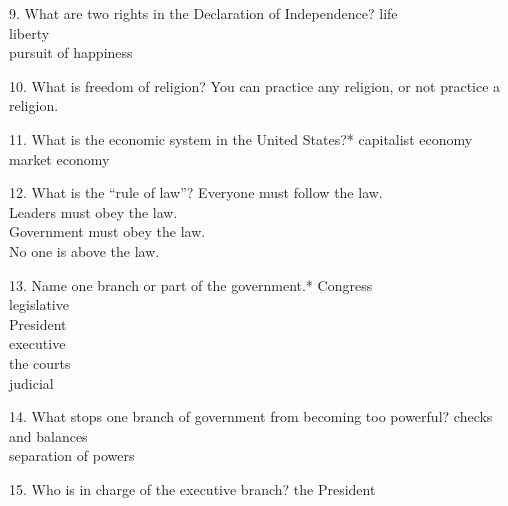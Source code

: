 \documentclass[avery5371,frame]{flashcards}
\begin{document}
        \begin{flashcard}{9. What are two rights in the Declaration of Independence?}
        {life\\liberty\\pursuit of happiness}
        \end{flashcard}
        \begin{flashcard}{10. What is freedom of religion?}
        {You can practice any religion, or not practice a religion.}
        \end{flashcard}
        \begin{flashcard}{11. What is the economic system in the United States?*}
        {capitalist economy\\market economy}
        \end{flashcard}
        \begin{flashcard}{12. What is the “rule of law”?}
        {Everyone must follow the law.\\Leaders must obey the law.\\Government must obey the law.\\No one is above the law.}
        \end{flashcard}
        \begin{flashcard}{13. Name one branch or part of the government.*}
        {Congress\\legislative\\President\\executive\\the courts\\judicial}
        \end{flashcard}
        \begin{flashcard}{14. What stops one branch of government from becoming too powerful?}
        {checks and balances\\separation of powers}
        \end{flashcard}
        \begin{flashcard}{15. Who is in charge of the executive branch?}
        {the President}
        \end{flashcard}
\end{document}
